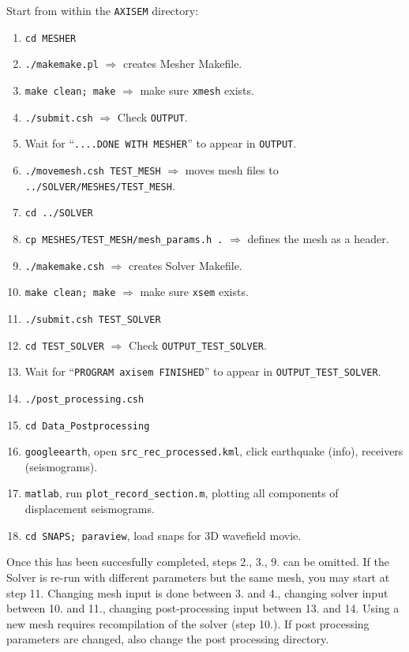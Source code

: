 \documentclass[11pt,letter,fleqn,english,notitlepage]{article}
\begin{document}
\noindent Start from within the {\tt AXISEM} directory:
\begin{enumerate}
\item {\tt cd MESHER}
\item {\tt ./makemake.pl} $\Rightarrow$ creates Mesher Makefile.
\item {\tt make clean; make} $\Rightarrow$ make sure {\tt xmesh} exists.
\item {\tt ./submit.csh} $\Rightarrow$ Check {\tt OUTPUT}.
\item Wait for ``{\tt ....DONE WITH MESHER}'' to appear in {\tt OUTPUT}.
\item {\tt ./movemesh.csh TEST\_MESH} $\Rightarrow$ moves mesh files to {\tt ../SOLVER/MESHES/TEST\_MESH}.
\item {\tt cd ../SOLVER}
\item {\tt cp MESHES/TEST\_MESH/mesh\_params.h .} $\Rightarrow$ defines the mesh as a header.
\item {\tt ./makemake.csh} $\Rightarrow$ creates Solver Makefile.
\item {\tt make clean; make} $\Rightarrow$ make sure {\tt xsem} exists.
\item {\tt ./submit.csh TEST\_SOLVER} 
\item {\tt cd TEST\_SOLVER} $\Rightarrow$ Check {\tt OUTPUT\_TEST\_SOLVER}.
\item Wait for ``{\tt  PROGRAM axisem FINISHED}'' to appear in {\tt OUTPUT\_TEST\_SOLVER}.
\item {\tt ./post\_processing.csh}
\item {\tt cd Data\_Postprocessing} 
\item {\tt googleearth}, open {\tt src\_rec\_processed.kml}, click earthquake (info), receivers (seismograms).
\item {\tt matlab}, run {\tt plot\_record\_section.m}, plotting all components of displacement seismograms.
\item {\tt cd SNAPS; paraview}, load snaps for 3D wavefield movie.
\end{enumerate}
Once this has been succesfully completed, steps 2., 3., 9. can be omitted. If the Solver is re-run with different parameters but the
same mesh, you may start at step 11. Changing mesh input is done between 3. and 4., changing solver input between 10. and 11.,
changing post-processing input between 13. and 14. Using a new mesh requires recompilation of the solver (step 10.). If post
processing parameters are changed, also change the post processing directory.
\end{document}

